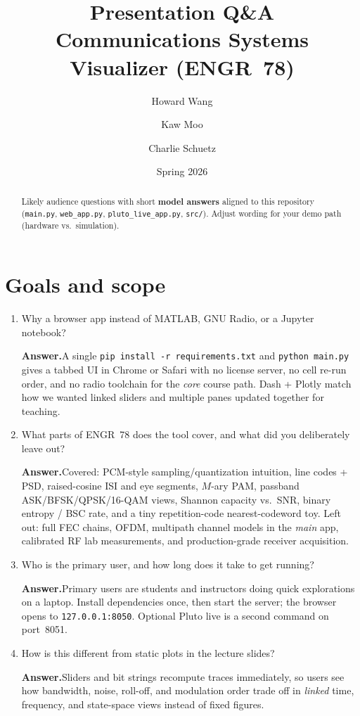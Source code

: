 \documentclass[11pt]{article}
\title{Presentation Q\&A\\\large Communications Systems Visualizer (ENGR~78)}
\author{Howard Wang \and Kaw Moo \and Charlie Schuetz}
\date{Spring 2026}
\newenvironment{qaitem}{%
  \begin{enumerate}[label=\textbf{Q\arabic*.}, leftmargin=2.2em, itemsep=1.1em, listparindent=0pt]
}{%
  \end{enumerate}%
}
\newcommand{\Ans}{\par\noindent\textbf{Answer.}\quad}
\begin{document}
\maketitle

\begin{abstract}
\noindent
Likely audience questions with short \textbf{model answers} aligned to this repository (\texttt{main.py}, \texttt{web\_app.py}, \texttt{pluto\_live\_app.py}, \texttt{src/}). Adjust wording for your demo path (hardware vs.\ simulation).
\end{abstract}

\section*{Goals and scope}

\begin{qaitem}
  \item Why a browser app instead of MATLAB, GNU Radio, or a Jupyter notebook?
  \Ans A single \texttt{pip install -r requirements.txt} and \texttt{python main.py} gives a tabbed UI in Chrome or Safari with no license server, no cell re-run order, and no radio toolchain for the \emph{core} course path. Dash + Plotly match how we wanted linked sliders and multiple panes updated together for teaching.

  \item What parts of ENGR~78 does the tool cover, and what did you deliberately leave out?
  \Ans Covered: PCM-style sampling/quantization intuition, line codes + PSD, raised-cosine ISI and eye segments, $M$-ary PAM, passband ASK/BFSK/QPSK/16-QAM views, Shannon capacity vs.\ SNR, binary entropy / BSC rate, and a tiny repetition-code nearest-codeword toy. Left out: full FEC chains, OFDM, multipath channel models in the \emph{main} app, calibrated RF lab measurements, and production-grade receiver acquisition.

  \item Who is the primary user, and how long does it take to get running?
  \Ans Primary users are students and instructors doing quick explorations on a laptop. Install dependencies once, then start the server; the browser opens to \texttt{127.0.0.1:8050}. Optional Pluto live is a second command on port~8051.

  \item How is this different from static plots in the lecture slides?
  \Ans Sliders and bit strings recompute traces immediately, so users see how bandwidth, noise, roll-off, and modulation order trade off in \emph{linked} time, frequency, and state-space views instead of fixed figures.
\end{qaitem}
\end{document}
